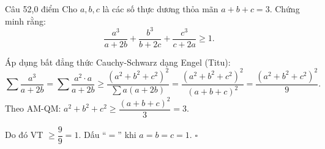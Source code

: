 \begin{de_cau}{Câu 5}{2,0 điểm}
Cho $a, b, c$ là các số thực dương thỏa mãn $a + b + c = 3$. Chứng minh rằng:
\[\dfrac{a^3}{a + 2b} + \dfrac{b^3}{b + 2c} + \dfrac{c^3}{c + 2a} \ge 1.\]
\end{de_cau}

\begin{loi_giai_cau}
Áp dụng bất đẳng thức Cauchy-Schwarz dạng Engel (Titu):
\[\sum \frac{a^3}{a+2b} = \sum \frac{a^2 \cdot a}{a+2b} \ge \frac{(a^2+b^2+c^2)^2}{\sum a(a+2b)} = \frac{(a^2+b^2+c^2)^2}{(a+b+c)^2} = \frac{(a^2+b^2+c^2)^2}{9}.\]
Theo AM-QM: $a^2+b^2+c^2 \ge \dfrac{(a+b+c)^2}{3} = 3$.

Do đó VT $\ge \dfrac{9}{9} = 1$. Dấu ``$=$'' khi $a=b=c=1$. $\square$
\end{loi_giai_cau}
